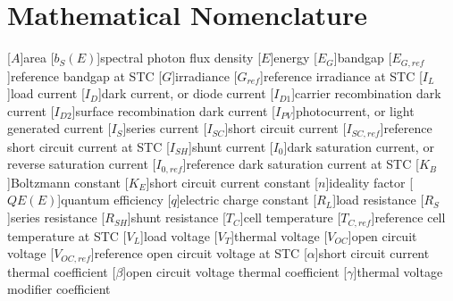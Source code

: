 \chapter{Mathematical Nomenclature}\label{appendix:math_nomenclature}

\begin{acronym}
    [$A$]{area}
    [$b_S(E)$]{spectral photon flux density}
    [$E$]{energy}
    [$E_G$]{bandgap}
    [$E_{G,ref}$]{reference bandgap at STC}
    [$G$]{irradiance}
    [$G_{ref}$]{reference irradiance at STC}
    [$I_L$]{load current}
    [$I_D$]{dark current, or diode current}
    [$I_{D1}$]{carrier recombination dark current}
    [$I_{D2}$]{surface recombination dark current}
    [$I_{PV}$]{photocurrent, or light generated current}
    [$I_S$]{series current}
    [$I_{SC}$]{short circuit current}
    [$I_{SC,ref}$]{reference short circuit current at STC}
    [$I_{SH}$]{shunt current}
    [$I_0$]{dark saturation current, or reverse saturation current}
    [$I_{0,ref}$]{reference dark saturation current at STC}
    [$K_B$]{Boltzmann constant}
    [$K_E$]{short circuit current constant}
    [$n$]{ideality factor}
    [$QE(E)$]{quantum efficiency}
    [$q$]{electric charge constant}
    [$R_L$]{load resistance}
    [$R_S$]{series resistance}
    [$R_{SH}$]{shunt resistance}
    [$T_C$]{cell temperature}
    [$T_{C,ref}$]{reference cell temperature at STC}
    [$V_L$]{load voltage}
    [$V_T$]{thermal voltage}
    [$V_{OC}$]{open circuit voltage}
    [$V_{OC,ref}$]{reference open circuit voltage at STC}
    [$\alpha$]{short circuit current thermal coefficient}
    [$\beta$]{open circuit voltage thermal coefficient}
    [$\gamma$]{thermal voltage modifier coefficient}
\end{acronym}